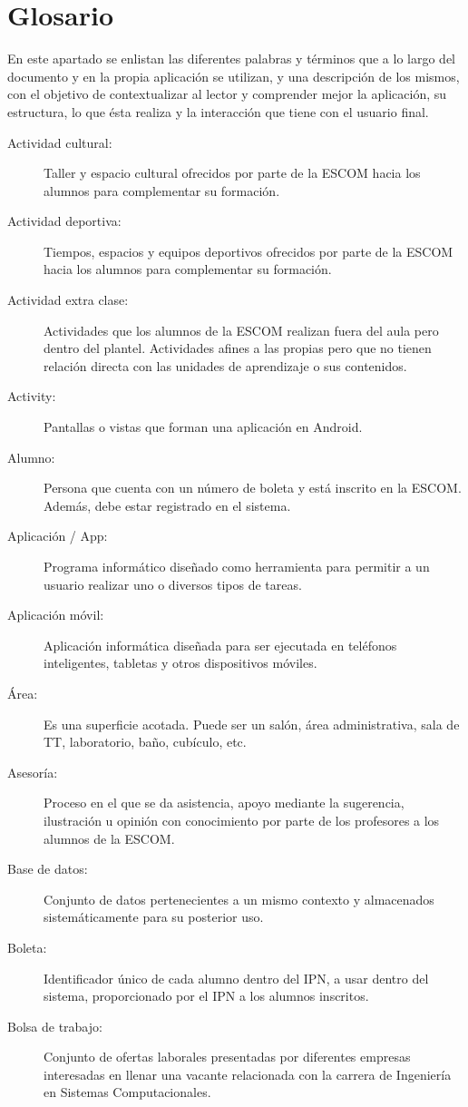 \section{Glosario}

\noindent
En este apartado se enlistan las diferentes palabras y términos que a lo largo del documento y en la propia aplicación se utilizan, y una descripción de los mismos, con el objetivo de contextualizar al lector y comprender mejor la aplicación, su estructura, lo que ésta realiza y la interacción que tiene con el usuario final. \\

\begin{description}
	\item[Actividad cultural:] Taller y espacio cultural ofrecidos por parte de la ESCOM hacia los alumnos para complementar su formación. 
	\item[Actividad deportiva:] Tiempos, espacios y equipos deportivos ofrecidos por parte de la ESCOM hacia los alumnos para complementar su formación. 
	\item[Actividad extra clase:] Actividades que los alumnos de la ESCOM realizan fuera del aula pero dentro del plantel. Actividades afines a las propias pero que no tienen relación directa con las unidades de aprendizaje o sus contenidos. 
	\item[Activity:] Pantallas o vistas que forman una aplicación en Android.
	\item[Alumno:] Persona que cuenta con un número de boleta y está inscrito en la ESCOM. Además, debe estar registrado en el sistema.
	\item[Aplicación / App:] Programa informático diseñado como herramienta para permitir a un usuario realizar uno o diversos tipos de tareas. 
	\item[Aplicación móvil:] Aplicación informática diseñada para ser ejecutada en teléfonos inteligentes, tabletas y otros dispositivos móviles. 
	\item[Área:] Es una superficie acotada. Puede ser un salón, área administrativa, sala de TT, laboratorio, baño, cubículo, etc.
	\item[Asesoría:] Proceso en el que se da asistencia, apoyo mediante la sugerencia, ilustración u opinión con conocimiento por parte de los profesores a los alumnos de la ESCOM.
	
	\item[Base de datos:] Conjunto de datos pertenecientes a un mismo contexto y almacenados sistemáticamente para su posterior uso.
	\item[Boleta:] Identificador único de cada alumno dentro del IPN, a usar dentro del sistema, proporcionado por el IPN a los alumnos inscritos.
	\item[Bolsa de trabajo:] Conjunto de ofertas laborales presentadas por diferentes empresas interesadas en llenar una vacante relacionada con la carrera de Ingeniería en Sistemas Computacionales.
	

\end{description}
